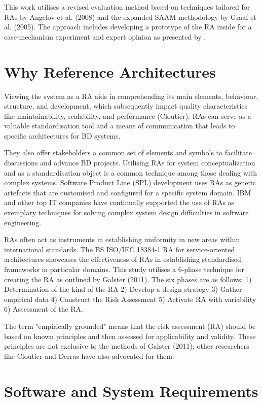 \documentclass[journal]{IEEEtran}
\begin{document}
This work utilises a revised evaluation method based on techniques tailored for RAs by Angelov et al. (2008) and the expanded SAAM methodology by Graaf et al. (2005). The approach includes developing a prototype of the RA inside for a case-mechanism experiment  and expert opinion as presented by \cite{wieringa2014design}.

\section{Why Reference Architectures}
\label{sec:why_reference_architectures}

Viewing the system as a RA aids in comprehending its main elements, behaviour, structure, and development, which subsequently impact quality characteristics like maintainability, scalability, and performance (Cloutier). RAs can serve as a valuable standardisation tool and a means of communication that leads to specific architectures for BD systems. 

They also offer stakeholders a common set of elements and symbols to facilitate discussions and advance BD projects. Utilising RAs for system conceptualization and as a standardisation object is a common technique among those dealing with complex systems. Software Product Line (SPL) development uses RAs as generic artefacts that are customised and configured for a specific system domain. IBM and other top IT companies have continually supported the use of RAs as exemplary techniques for solving complex system design difficulties in software engineering. 

RAs often act as instruments in establishing uniformity in new areas within international standards. The BS ISO/IEC 18384-1 RA for service-oriented architectures showcases the effectiveness of RAs in establishing standardised frameworks in particular domains. This study utilises a 6-phase technique for creating the RA as outlined by Galster (2011). The six phases are as follows: 1) Determination of the kind of the RA 2) Develop a design strategy 3) Gather empirical data 4) Construct the Risk Assessment 5) Activate RA with variability 6) Assessment of the RA. 

The term "empirically grounded" means that the risk assessment (RA) should be based on known principles and then assessed for applicability and validity. These principles are not exclusive to the methods of Galster (2011); other researchers like Cloutier and Derras have also advocated for them.


\section{Software and System Requirements}
\label{sec:software_and_system_requirements}
\end{document}
